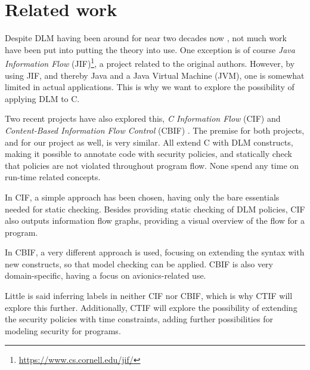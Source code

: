 
\section{Related work}
Despite DLM having been around for near two decades now \cite{myers1997}, not much work have been put into putting the theory into use.
One exception is of course \emph{Java Information Flow} (JIF)\footnote{\url{https://www.cs.cornell.edu/jif/}}, a project related to the original authors.
However, by using JIF, and thereby Java and a Java Virtual Machine (JVM), one is somewhat limited in actual applications.
This is why we want to explore the possibility of applying DLM to C.

Two recent projects have also explored this, \emph{C Information Flow} (CIF) \cite{muller2015cif} and \emph{Content-Based Information Flow Control} (CBIF) \cite{maciazek2016cbif}.
The premise for both projects, and for our project as well, is very similar.
All extend C with DLM constructs, making it possible to annotate code with security policies, and statically check that policies are not violated throughout program flow.
None spend any time on run-time related concepts.

In CIF, a simple approach has been chosen, having only the bare essentials needed for static checking.
Besides providing static checking of DLM policies, CIF also outputs information flow graphs, providing a visual overview of the flow for a program.

In CBIF, a very different approach is used, focusing on extending the syntax with new constructs, so that model checking can be applied.
CBIF is also very domain-specific, having a focus on avionics-related use.

Little is said inferring labels in neither CIF nor CBIF, which is why CTIF will explore this further.
Additionally, CTIF will explore the possibility of extending the security policies with time constraints, adding further possibilities for modeling security for programs.

